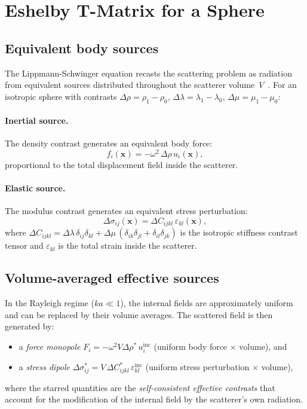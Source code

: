 \documentclass[11pt,a4paper]{article}
\newcommand{\bx}{\mathbf{x}}
\newcommand{\Dlam}{\Delta\lambda}
\newcommand{\Dmu}{\Delta\mu}
\newcommand{\Drho}{\Delta\rho}
\begin{document}
\section{Eshelby T-Matrix for a Sphere}
\label{sec:eshelby}

\subsection{Equivalent body sources}

The Lippmann-Schwinger equation recasts the scattering problem as
radiation from equivalent sources distributed throughout the scatterer
volume~$V$~\cite{GubernatisDomanyKrumhansl1977}.  For an isotropic
sphere with contrasts $\Drho = \rho_1 - \rho_0$,
$\Dlam = \lambda_1 - \lambda_0$, $\Dmu = \mu_1 - \mu_0$:

\paragraph{Inertial source.}
The density contrast generates an equivalent body force:
\begin{equation}
  f_i(\bx) = -\omega^2\,\Drho\,u_i(\bx),
  \label{eq:force_source}
\end{equation}
proportional to the total displacement field inside the scatterer.

\paragraph{Elastic source.}
The modulus contrast generates an equivalent stress perturbation:
\begin{equation}
  \Delta\sigma_{ij}(\bx) = \Delta C_{ijkl}\,\varepsilon_{kl}(\bx),
  \label{eq:stress_source}
\end{equation}
where $\Delta C_{ijkl} = \Dlam\,\delta_{ij}\delta_{kl}
+ \Dmu\,(\delta_{ik}\delta_{jl} + \delta_{il}\delta_{jk})$ is the
isotropic stiffness contrast tensor and $\varepsilon_{kl}$ is the
total strain inside the scatterer.

\subsection{Volume-averaged effective sources}

In the Rayleigh regime ($ka \ll 1$), the internal fields are
approximately uniform and can be replaced by their volume averages.
The scattered field is then generated by:
\begin{itemize}
  \item a \emph{force monopole}
    $F_i = -\omega^2 V \Drho^*\,u_i^\text{inc}$
    (uniform body force $\times$ volume), and
  \item a \emph{stress dipole}
    $\Delta\sigma^*_{ij} = V\,\Delta C^*_{ijkl}\,
    \varepsilon_{kl}^\text{inc}$
    (uniform stress perturbation $\times$ volume),
\end{itemize}
where the starred quantities are the \emph{self-consistent effective
contrasts} that account for the modification of the internal field by
the scatterer's own radiation.
\end{document}
